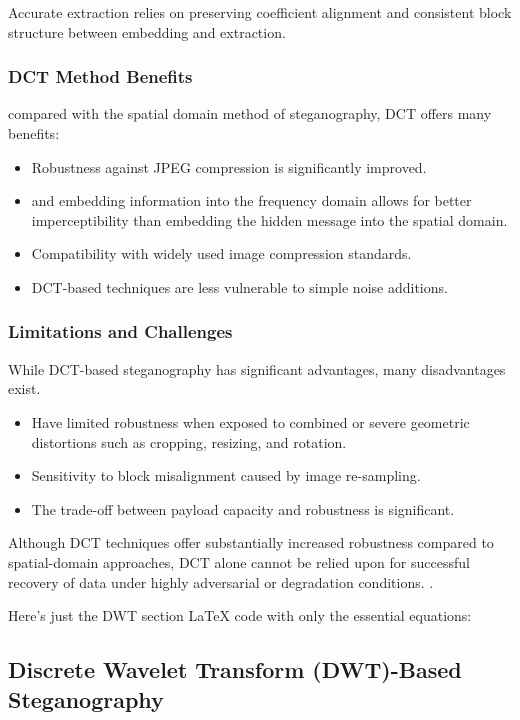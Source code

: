 \documentclass[12pt,a4paper,oneside]{report}
\begin{document}
	Accurate extraction relies on preserving coefficient alignment and consistent block structure between embedding and extraction.
	
	\subsubsection{DCT Method Benefits}
	compared with the spatial domain method of steganography, DCT offers many benefits:
	\begin{itemize}
		\item Robustness against JPEG compression is significantly improved.
		\item and embedding information into the frequency domain allows for better imperceptibility than embedding the hidden message into the spatial domain.
		\item Compatibility with widely used image compression standards.
		\item DCT-based techniques are less vulnerable to simple noise additions.
	\end{itemize}
	
	\subsubsection{Limitations and Challenges}
	While DCT-based steganography has significant advantages, many disadvantages exist.
	\begin{itemize}
		\item  Have limited robustness when exposed to combined or severe geometric distortions such as cropping, resizing, and rotation.
		\item Sensitivity to block misalignment caused by image re-sampling.
		\item The trade-off between payload capacity and robustness is significant.
	\end{itemize}
	
	Although DCT techniques offer substantially increased robustness compared to spatial-domain approaches, DCT alone cannot be relied upon for successful recovery of data under highly adversarial or degradation conditions. \cite{petitcolas1999information}.
	
	
	Here's just the DWT section LaTeX code with only the essential equations:
	
	\subsection{Discrete Wavelet Transform (DWT)-Based Steganography}
	
\end{document}
